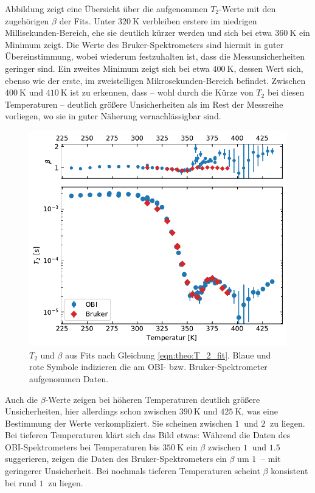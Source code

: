 Abbildung \label{fig:res:T_2} zeigt eine Übersicht über die aufgenommen $T_2$-Werte mit den zugehörigen $\beta$ der Fits. Unter $\SI{320}{\kelvin}$ verbleiben erstere im niedrigen Millisekunden-Bereich, ehe sie deutlich kürzer werden und sich bei etwa $\SI{360}{\kelvin}$ ein Minimum zeigt. Die Werte des Bruker-Spektrometers sind hiermit in guter Übereinstimmung, wobei wiederum festzuhalten ist, dass die Messunsicherheiten geringer sind. Ein zweites Minimum zeigt sich bei etwa $\SI{400}{\kelvin}$, dessen Wert sich, ebenso wie der erste, im zweistelligen Mikrosekunden-Bereich befindet. Zwischen $\SI{400}{\kelvin}$ und $\SI{410}{\kelvin}$ ist zu erkennen, dass -- wohl durch die Kürze von $T_2$ bei diesen Temperaturen -- deutlich größere Unsicherheiten als im Rest der Messreihe vorliegen, wo sie in guter Näherung vernachlässigbar sind.
\begin{figure}
	\begin{center}
		\includegraphics[width=.9\textwidth]{graphics/plot/t2.pdf}
	\end{center}
	\caption{$T_2$ und $\beta$ aus Fits nach Gleichung \eqref{eqn:theo:T_2_fit}. Blaue und rote Symbole indizieren die am OBI- bzw. Bruker-Spektrometer aufgenommen Daten.} \label{fig:res:T_2}
\end{figure}

Auch die $\beta$-Werte zeigen bei höheren Temperaturen deutlich größere Unsicherheiten, hier allerdings schon zwischen $\SI{390}{\kelvin}$ und $\SI{425}{\kelvin}$, was eine Bestimmung der Werte verkompliziert. Sie scheinen zwischen $\SI{1}{}$ und $\SI{2}{}$ zu liegen. Bei tieferen Temperaturen klärt sich das Bild etwas: Während die Daten des OBI-Spektrometers bei Temperaturen bis $\SI{350}{\kelvin}$ ein $\beta$ zwischen $\SI{1}{}$ und $\SI{1.5}{}$ suggerieren, zeigen die Daten des Bruker-Spektrometers ein $\beta$ um $\SI{1}{}$ -- mit geringerer Unsicherheit. Bei nochmals tieferen Temperaturen scheint $\beta$ konsistent bei rund $\SI{1}{}$ zu liegen.




